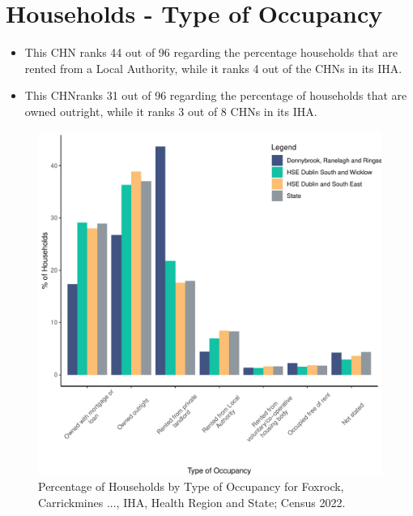 \documentclass{article}
\begin{document}
\section{Households - Type of Occupancy}\label{sect:Households}
\begin{itemize}
\item This CHN ranks  44 out of 96 regarding the percentage households that are rented from a Local Authority, while it ranks  4 out of the CHNs in its IHA. 
\item This CHNranks  31 out of 96 regarding the percentage of households that are owned outright, while it ranks   3 out of 8 CHNs in its IHA.
\end{itemize}
\begin{figure}[H]
	\centering
	\includegraphics[width = 140mm]{../figures/HouseholdsED.pdf}
	\caption{Percentage of Households by Type of Occupancy for Foxrock, Carrickmines ..., IHA, Health Region and State; Census 2022.}
	\label{fig:vbnv}
	\end{figure}
\end{document}
